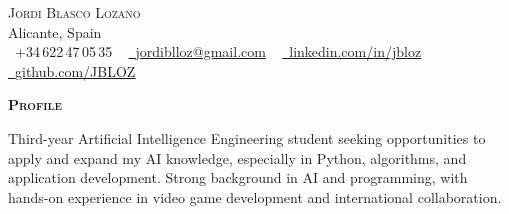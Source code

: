 \documentclass[letterpaper,11pt]{article}
\begin{document}
\begin{center}
    {\Huge \scshape Jordi Blasco Lozano} \\ \vspace{1pt}
    Alicante, Spain \\ \vspace{1pt}
    \small \raisebox{-0.1\height}\faPhone\ +34\,622\,47\,05\,35 ~
    \href{mailto:jordiblloz@gmail.com}{\raisebox{-0.2\height}\faEnvelope\ \underline{jordiblloz@gmail.com}} ~
    \href{https://linkedin.com/in/jbloz}{\raisebox{-0.2\height}\faLinkedin\ \underline{linkedin.com/in/jbloz}} ~
    \href{https://github.com/JBLOZ}{\raisebox{-0.2\height}\faGithub\ \underline{github.com/JBLOZ}}
\end{center}

\vspace{4pt}
{\scshape\large\bfseries Profile}\par
\vspace{2pt}
\small Third-year Artificial Intelligence Engineering student seeking opportunities to apply and expand my AI knowledge, especially in Python, algorithms, and application development. Strong background in AI and programming, with hands-on experience in video game development and international collaboration.
\vspace{6pt}
\end{document}
